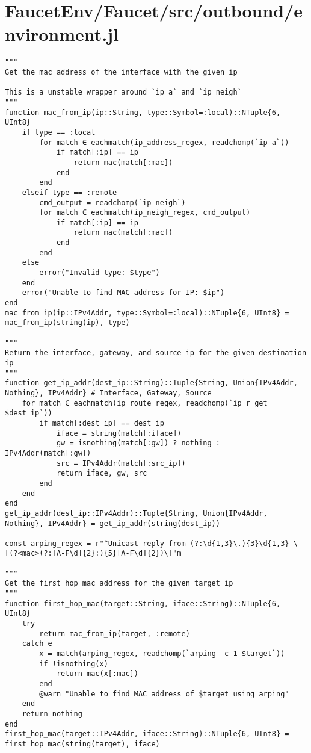 \section{FaucetEnv/Faucet/src/outbound/environment.jl}
\begin{lstlisting}[language=JuliaLocal, style=julia]
"""
Get the mac address of the interface with the given ip

This is a unstable wrapper around `ip a` and `ip neigh`
"""
function mac_from_ip(ip::String, type::Symbol=:local)::NTuple{6, UInt8}
    if type == :local
        for match ∈ eachmatch(ip_address_regex, readchomp(`ip a`))
            if match[:ip] == ip
                return mac(match[:mac])
            end
        end
    elseif type == :remote
        cmd_output = readchomp(`ip neigh`)
        for match ∈ eachmatch(ip_neigh_regex, cmd_output)
            if match[:ip] == ip
                return mac(match[:mac])
            end
        end
    else
        error("Invalid type: $type")
    end
    error("Unable to find MAC address for IP: $ip")
end
mac_from_ip(ip::IPv4Addr, type::Symbol=:local)::NTuple{6, UInt8} = mac_from_ip(string(ip), type)

"""
Return the interface, gateway, and source ip for the given destination ip
"""
function get_ip_addr(dest_ip::String)::Tuple{String, Union{IPv4Addr, Nothing}, IPv4Addr} # Interface, Gateway, Source
    for match ∈ eachmatch(ip_route_regex, readchomp(`ip r get $dest_ip`))
        if match[:dest_ip] == dest_ip
            iface = string(match[:iface])
            gw = isnothing(match[:gw]) ? nothing : IPv4Addr(match[:gw])
            src = IPv4Addr(match[:src_ip])
            return iface, gw, src
        end
    end
end
get_ip_addr(dest_ip::IPv4Addr)::Tuple{String, Union{IPv4Addr, Nothing}, IPv4Addr} = get_ip_addr(string(dest_ip))

const arping_regex = r"^Unicast reply from (?:\d{1,3}\.){3}\d{1,3} \[(?<mac>(?:[A-F\d]{2}:){5}[A-F\d]{2})\]"m

"""
Get the first hop mac address for the given target ip
"""
function first_hop_mac(target::String, iface::String)::NTuple{6, UInt8}
    try
        return mac_from_ip(target, :remote)
    catch e
        x = match(arping_regex, readchomp(`arping -c 1 $target`))
        if !isnothing(x)
            return mac(x[:mac])
        end
        @warn "Unable to find MAC address of $target using arping"
    end
    return nothing
end
first_hop_mac(target::IPv4Addr, iface::String)::NTuple{6, UInt8} = first_hop_mac(string(target), iface)


\end{lstlisting}
